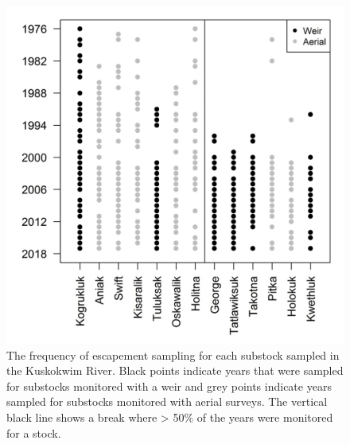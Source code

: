 \documentclass[12pt,]{book}
\theoremstyle{definition}
\theoremstyle{definition}
\theoremstyle{definition}
\theoremstyle{remark}
\begin{document}
\clearpage

\begin{figure}
  \centering
  \includegraphics{img/Ch4/obs-freq.jpg}
  \caption{The frequency of escapement sampling for each substock sampled in the Kuskokwim River. Black points indicate years that were sampled for substocks monitored with a weir and grey points indicate years sampled for substocks monitored with aerial surveys. The vertical black line shows a break where > 50\% of the years were monitored for a stock.}
  \label{fig:obs-freq}
\end{figure}

\clearpage
\end{document}
